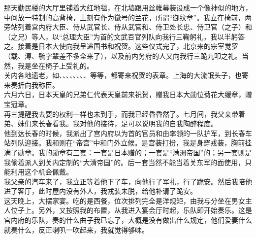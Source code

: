 那天勤民楼的大厅里铺着大红地毯，在北墙跟用丝帷幕装设成一个像神似的地方，中间放一特制的高背椅，上刻有作为徽号的兰花，所谓“御纹章”。我立在椅前，两旁站列着宫内府大臣、侍从武官长、侍从武官和、侍卫处长忠、侍卫官（之子）和（之兄）等人，以“总理大臣”为首的文武百官列队向我行三鞠躬礼，我以半躬答之。接着是日本大使向我呈递国书和祝贺。这些仪式完了，北京来的宗室觉罗（载、溥、毓字辈差不多全来了），以及前内务府的人又向我行三跪九叩之礼。当然，我是坐在椅子上受礼的。\\

关内各地遗老，如、、、、、、、、等等，都寄来祝贺的表章。上海的大流氓头子，也寄来奏折向我称臣。\\

六月六日，日本天皇的兄弟仁代表天皇前来祝贺，赠我日本大勋位菊花大缓章，赠宝冠章。\\

再三提醒我去要的权利一样也未到手，而我已经昏昏然了。七月间，我父亲带着弟、妹们来长春看我。我对他的接待，足可以说明我的自我陶醉程度。\\

他到达长春的时候，我派出了宫内府以为首的官员和由率领的一队护军，到长春车站列队迎接。我和则在“帝宫”中和门外立候。是宫装打扮，我是身穿戎装，胸前挂满了勋章。我的勋章有三套：一套是日本赠的；一套是“满洲帝国”的；另一套则是我偷着派人到关内定制的“大清帝国”的。后一套当然不能当着关东军的面使用，只能利用这个机会佩戴。\\

我父亲的汽车来了，我立正等着他下了车，向他行了军礼，行了跪安。然后我陪他进了客厅，此时屋内没有外人，我戎装未脱，给他补请了跪安。\\

这天晚上，大摆家宴。吃的是西餐，位次排列完全是洋规矩，由我与分坐在男女主人位子上。另外，又按照我的布置，从我进入宴会厅时起，乐队即开始奏乐。这是宫内府的乐队，奏的什么曲子我已忘了，大概是没有做出什么规定，他们爱妻什么就奏什么，反正喇叭一吹起来，我就觉得够味。\\


